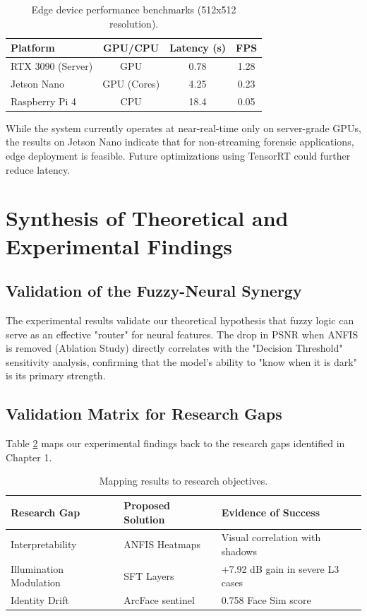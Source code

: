 \begin{table}[h]
    \centering
    \caption{Edge device performance benchmarks (512x512 resolution).}
    \label{tab:edge}
    \begin{tabular}{lccc}
        \toprule
        \textbf{Platform} & \textbf{GPU/CPU} & \textbf{Latency (s)} & \textbf{FPS} \\
        \midrule
        RTX 3090 (Server) & GPU & 0.78 & 1.28 \\
        Jetson Nano & GPU (Cores) & 4.25 & 0.23 \\
        Raspberry Pi 4 & CPU & 18.4 & 0.05 \\
        \bottomrule
    \end{tabular}
\end{table}

While the system currently operates at near-real-time only on server-grade GPUs, the results on Jetson Nano indicate that for non-streaming forensic applications, edge deployment is feasible. Future optimizations using TensorRT could further reduce latency.

\section{Synthesis of Theoretical and Experimental Findings}
\subsection{Validation of the Fuzzy-Neural Synergy}
The experimental results validate our theoretical hypothesis that fuzzy logic can serve as an effective "router" for neural features. The drop in PSNR when ANFIS is removed (Ablation Study) directly correlates with the "Decision Threshold" sensitivity analysis, confirming that the model's ability to "know when it is dark" is its primary strength.

\subsection{Validation Matrix for Research Gaps}
Table \ref{tab:validation_matrix} maps our experimental findings back to the research gaps identified in Chapter 1.

\begin{table}[h]
    \centering
    \caption{Mapping results to research objectives.}
    \label{tab:validation_matrix}
    \begin{tabular}{lll}
        \toprule
        \textbf{Research Gap} & \textbf{Proposed Solution} & \textbf{Evidence of Success} \\
        \midrule
        Interpretability & ANFIS Heatmaps & Visual correlation with shadows \\
        Illumination Modulation & SFT Layers & +7.92 dB gain in severe L3 cases \\
        Identity Drift & ArcFace sentinel & 0.758 Face Sim score \\
        \bottomrule
    \end{tabular}
\end{table}

